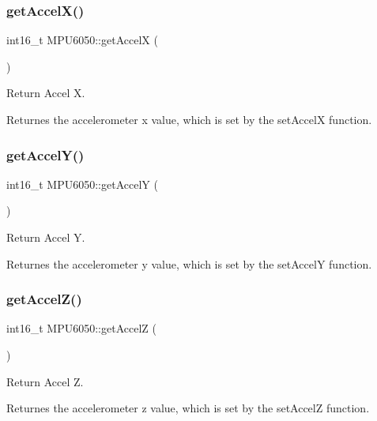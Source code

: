 \subsubsection{\texorpdfstring{get\+Accel\+X()}{getAccelX()}}
{\footnotesize\ttfamily int16\+\_\+t M\+P\+U6050\+::get\+AccelX (\begin{DoxyParamCaption}{ }\end{DoxyParamCaption})}



Return Accel X. 

Returnes the accelerometer x value, which is set by the set\+AccelX function. \mbox{\label{class_m_p_u6050_a5a6328a583b3eabcd69c63f7b3e5fc78}} 
\subsubsection{\texorpdfstring{get\+Accel\+Y()}{getAccelY()}}
{\footnotesize\ttfamily int16\+\_\+t M\+P\+U6050\+::get\+AccelY (\begin{DoxyParamCaption}{ }\end{DoxyParamCaption})}



Return Accel Y. 

Returnes the accelerometer y value, which is set by the set\+AccelY function. \mbox{\label{class_m_p_u6050_a67d656ca5338e7c4f791c19838ae7c53}} 
\subsubsection{\texorpdfstring{get\+Accel\+Z()}{getAccelZ()}}
{\footnotesize\ttfamily int16\+\_\+t M\+P\+U6050\+::get\+AccelZ (\begin{DoxyParamCaption}{ }\end{DoxyParamCaption})}



Return Accel Z. 

Returnes the accelerometer z value, which is set by the set\+AccelZ function. \mbox{\label{class_m_p_u6050_afb431ff03c361fbbfc43e668996be195}} 
